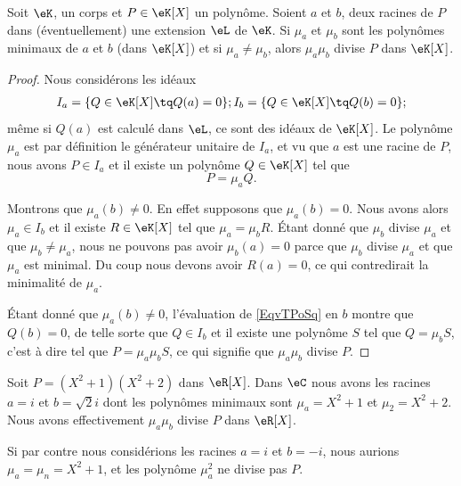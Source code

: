 \begin{proposition} \label{PropyMTEbH}
    Soit \( \eK\), un corps et \( P\in \eK[X]\) un polynôme. Soient \( a\) et \( b\), deux racines de \( P\) dans (éventuellement) une extension \( \eL\) de \( \eK\). Si \( \mu_a\) et \( \mu_b\) sont les polynômes minimaux de \( a\) et \( b\) (dans \( \eK[X]\)) et si \( \mu_a\neq \mu_b\), alors \( \mu_a\mu_b\) divise \( P\) dans \( \eK[X]\).
\end{proposition}

\begin{proof}
    Nous considérons les idéaux
    \begin{subequations}
        \begin{align}
            I_a=\{ Q\in \eK[X]\tq Q(a)=0 \};
            I_b=\{ Q\in \eK[X]\tq Q(b)=0 \};
        \end{align}
    \end{subequations}
    même si \( Q(a)\) est calculé dans \( \eL\), ce sont des idéaux de \( \eK[X]\). Le polynôme \( \mu_a\) est par définition le générateur unitaire de \( I_a\), et vu que \( a\) est une racine de \( P\), nous avons \( P\in I_a\) et il existe un polynôme \( Q\in \eK[X]\) tel que 
    \begin{equation}    \label{EqvTPoSq}
        P=\mu_aQ.
    \end{equation}

    Montrons que \( \mu_a(b)\neq 0\). En effet supposons que \( \mu_a(b)=0\). Nous avons alors \( \mu_a\in I_b\) et il existe \( R\in \eK[X]\) tel que \( \mu_a=\mu_bR\). Étant donné que \( \mu_b\) divise \( \mu_a\) et que \( \mu_b\neq \mu_a\), nous ne pouvons pas avoir \( \mu_b(a)=0\) parce que \( \mu_b\) divise \( \mu_a\) et que \( \mu_a\) est minimal. Du coup nous devons avoir \( R(a)=0\), ce qui contredirait la minimalité de \( \mu_a\).

    Étant donné que \( \mu_a(b)\neq 0\), l'évaluation de \eqref{EqvTPoSq} en \( b\) montre que \( Q(b)=0\), de telle sorte que \( Q\in I_b\) et il existe une polynôme \( S\) tel que \( Q=\mu_bS\), c'est à dire tel que \( P=\mu_a\mu_bS\), ce qui signifie que \( \mu_a\mu_b\) divise \( P\).
\end{proof}

\begin{example}
    Soit \( P=(X^2+1)(X^2+2)\) dans \( \eR[X]\). Dans \( \eC\) nous avons les racines \( a=i\) et \( b=\sqrt{2}i\) dont les polynômes minimaux sont \( \mu_a=X^2+1\) et \( \mu_2=X^2+2\). Nous avons effectivement \( \mu_a\mu_b\) divise \( P\) dans \( \eR[X]\).

    Si par contre nous considérions les racines \( a=i\) et \( b=-i\), nous aurions \( \mu_a=\mu_n=X^2+1\), et les polynôme \( \mu_a^2\) ne divise pas \( P\).
\end{example}

